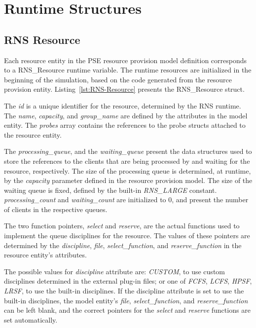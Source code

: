 \section{Runtime Structures}
\subsection{RNS Resource}
Each resource entity in the PSE resource provision model definition corresponds to a RNS\_Resource runtime variable. The runtime resources are initialized in the beginning of the simulation, based on the code generated from the resource provision entity. Listing~\ref{lst:RNS-Resource} presents the RNS\_Resource struct.



The \emph{id} is a unique identifier for the resource, determined by the RNS runtime. The \emph{name}, \emph{capacity}, and \emph{group\_name} are defined by the attributes in the model entity. The \emph{probes} array contains the references to the probe structs attached to the resource entity.

The \emph{processing\_queue}, and the \emph{waiting\_queue} present the data structures used to store the references to the clients that are being processed by and waiting for the resource, respectively. The size of the processing queue is determined, at runtime, by the \emph{capacity} parameter defined in the resource provision model. The size of the waiting queue is fixed, defined by the built-in \emph{RNS\_LARGE} constant. \emph{processing\_count} and \emph{waiting\_count} are initialized to 0, and present the number of clients in the respective queues.

The two function pointers, \emph{select} and \emph{reserve}, are the actual functions used to implement the queue disciplines for the resource. The values of these pointers are determined by the \emph{discipline}, \emph{file}, \emph{select\_function}, and \emph{reserve\_function} in the resource entity's attributes.

The possible values for \emph{discipline} attribute are: \emph{CUSTOM}, to use custom disciplines determined in the external plug-in files; or one of \emph{FCFS}, \emph{LCFS}, \emph{HPSF}, \emph{LRSF}, to use the built-in disciplines. If the discipline attribute is set to use the built-in disciplines, the model entity's \emph{file}, \emph{select\_function}, and \emph{reserve\_function} can be left blank, and the correct pointers for the \emph{select} and \emph{reserve} functions are set automatically.


